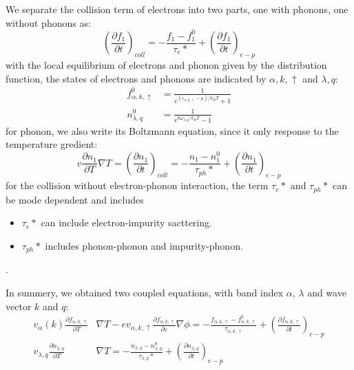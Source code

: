 \documentclass{article}
\newcommand{\pfrac}[2]{\frac{\partial #1}{\partial #2}}
\newcommand{\fak}{f_{\alpha,k,\uparrow}}
\newcommand{\nlq}{n_{\lambda,q}}
\newcommand{\ak}{\alpha,k,\uparrow}
\newcommand{\ql}{\lambda,q}
\begin{document}
We separate the collision term of electrons into two parts, one with phonons, one without phonons as:
\begin{equation}
    \left(\pfrac{f_1}{t}\right)_{coll} = -\frac{f_1 - f_1^0}{\tau_e *} + \left(\pfrac{f_1}{t}\right)_{e-p}
\end{equation}
with the local equilibrium of electrons and phonon given by the distribution function, 
the states of electrons and phonons are indicated by $\ak$ and $\ql$:
\begin{align}
    \fak^0 &= \frac{1}{e^{(\varepsilon_{\ak}-\mu)/k_B T} +1} \\
    \nlq^0 &= \frac{1}{e^{\hbar \omega_{\ql}/k_B T} -1}  
\end{align}
for phonon, we also write its Boltzmann equation, since it only response to the temperature gredient:
\begin{equation}
    v \pfrac{n_1}{T} \nabla T = 
         \left(\pfrac{n_1}{t}\right)_{coll} = -\frac{n_1 - n_1^0}{\tau_{ph} *} + \left(\pfrac{n_1}{t}\right)_{e-p}
\end{equation}
for the collision without electron-phonon interaction, the term $\tau_e *$ and $\tau_{ph} *$ can 
be mode dependent and includes
\begin{itemize}
    \item $\tau_e *$ can include electron-impurity sacttering. 
    \item $\tau_{ph} *$ includes phonon-phonon and impurity-phonon.
\end{itemize}.

In summery, we obtained two coupled equations, with band index $\alpha$, $\lambda$ and wave vector
$k$ and $q$:
\begin{align}
    v_{\alpha}(k) \pfrac{\fak}{T} &\nabla T - 
      e v_{\ak} \pfrac{\fak}{\varepsilon}\nabla \phi = 
        -\frac{\fak - \fak^0}{\tau_{\ak}} + \left(\pfrac{\fak}{t}\right)_{e-p} \label{BTE1} \\
    v_{\ql} \pfrac{\nlq}{T} &\nabla T = 
      -\frac{\nlq - \nlq^0}{\tau_{\ql}*} + \left(\pfrac{\nlq}{t}\right)_{e-p} \label{BTE2}
\end{align}
\end{document}
